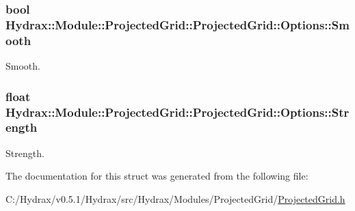 \hypertarget{struct_hydrax_1_1_module_1_1_projected_grid_1_1_options_1af465eea24f84ccf95ffb7fb40154d3}{
\subsubsection[{Smooth}]{\setlength{\rightskip}{0pt plus 5cm}bool Hydrax::Module::ProjectedGrid::ProjectedGrid::Options::Smooth}}
\label{struct_hydrax_1_1_module_1_1_projected_grid_1_1_options_1af465eea24f84ccf95ffb7fb40154d3}


Smooth. 

\hypertarget{struct_hydrax_1_1_module_1_1_projected_grid_1_1_options_d92bbf285f94fbd26a5164187c8d433b}{
\subsubsection[{Strength}]{\setlength{\rightskip}{0pt plus 5cm}float Hydrax::Module::ProjectedGrid::ProjectedGrid::Options::Strength}}
\label{struct_hydrax_1_1_module_1_1_projected_grid_1_1_options_d92bbf285f94fbd26a5164187c8d433b}


Strength. 



The documentation for this struct was generated from the following file:\begin{CompactItemize}
\item 
C:/Hydrax/v0.5.1/Hydrax/src/Hydrax/Modules/ProjectedGrid/\hyperlink{_projected_grid_8h}{ProjectedGrid.h}\end{CompactItemize}
